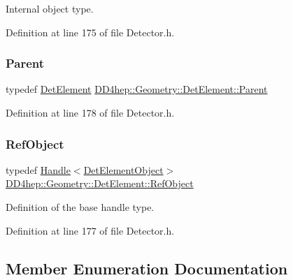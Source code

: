 Internal object type. 



Definition at line 175 of file Detector.\+h.

\hypertarget{class_d_d4hep_1_1_geometry_1_1_det_element_a31b56fd96597b66282406749b27263d1}{}\label{class_d_d4hep_1_1_geometry_1_1_det_element_a31b56fd96597b66282406749b27263d1} 
\subsubsection{\texorpdfstring{Parent}{Parent}}
{\footnotesize\ttfamily typedef \hyperlink{class_d_d4hep_1_1_geometry_1_1_det_element}{Det\+Element} \hyperlink{class_d_d4hep_1_1_geometry_1_1_det_element_a31b56fd96597b66282406749b27263d1}{D\+D4hep\+::\+Geometry\+::\+Det\+Element\+::\+Parent}}



Definition at line 178 of file Detector.\+h.

\hypertarget{class_d_d4hep_1_1_geometry_1_1_det_element_ae30cafd63395b1a95d161a51984db927}{}\label{class_d_d4hep_1_1_geometry_1_1_det_element_ae30cafd63395b1a95d161a51984db927} 
\subsubsection{\texorpdfstring{Ref\+Object}{RefObject}}
{\footnotesize\ttfamily typedef \hyperlink{class_d_d4hep_1_1_handle}{Handle}$<$\hyperlink{class_d_d4hep_1_1_geometry_1_1_det_element_object}{Det\+Element\+Object}$>$ \hyperlink{class_d_d4hep_1_1_geometry_1_1_det_element_ae30cafd63395b1a95d161a51984db927}{D\+D4hep\+::\+Geometry\+::\+Det\+Element\+::\+Ref\+Object}}



Definition of the base handle type. 



Definition at line 177 of file Detector.\+h.



\subsection{Member Enumeration Documentation}
\hypertarget{class_d_d4hep_1_1_geometry_1_1_det_element_a7a6c7f35568ec9e910ec981fa866362e}{}\label{class_d_d4hep_1_1_geometry_1_1_det_element_a7a6c7f35568ec9e910ec981fa866362e} 
